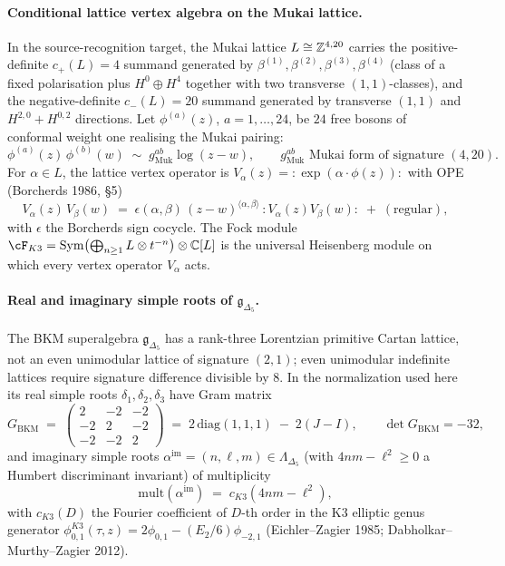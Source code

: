\paragraph{Conditional lattice vertex algebra on the Mukai lattice.}
In the source-recognition target, the Mukai lattice
$L \cong \mathbb{Z}^{4,20}$ carries the positive-definite
$c_+(L) = 4$ summand generated by
$\beta^{(1)},\beta^{(2)},\beta^{(3)},\beta^{(4)}$ (class of a fixed
polarisation plus $H^0 \oplus H^4$ together with two transverse
$(1,1)$-classes), and the negative-definite $c_-(L) = 20$ summand
generated by transverse $(1,1)$ and $H^{2,0}+H^{0,2}$ directions. Let
$\phi^{(a)}(z)$, $a = 1,\ldots,24$, be $24$ free bosons of conformal
weight one realising the Mukai pairing:
\begin{equation}
\label{eq:voa-muk-ope}
  \phi^{(a)}(z)\,\phi^{(b)}(w) \;\sim\; g^{ab}_{\mathrm{Muk}}\log(z-w),
  \qquad g^{ab}_{\mathrm{Muk}} \text{ Mukai form of signature }(4,20).
\end{equation}
For $\alpha \in L$, the lattice vertex operator is
$V_\alpha(z) = {:}\exp(\alpha\cdot\phi(z)){:}$ with OPE (Borcherds 1986, \S5)
\begin{equation}
\label{eq:voa-lattice-vo-ope}
  V_\alpha(z)\,V_\beta(w)
    \;=\;
    \epsilon(\alpha,\beta)\,(z-w)^{\langle\alpha,\beta\rangle}
    \,{:}V_\alpha(z)V_\beta(w){:} \;+\; (\text{regular}),
\end{equation}
with $\epsilon$ the Borcherds sign cocycle. The Fock module
$\cF_{K3} = \mathrm{Sym}\bigl(\bigoplus_{n\geq 1}L\otimes t^{-n}\bigr)
\otimes \Cbb[L]$ is the universal Heisenberg module on which every
vertex operator $V_\alpha$ acts.

\paragraph{Real and imaginary simple roots of $\mathfrak g_{\Delta_5}$.}
The BKM superalgebra $\mathfrak g_{\Delta_5}$ has a rank-three
Lorentzian primitive Cartan lattice, not an even unimodular lattice of
signature $(2,1)$; even unimodular indefinite lattices require
signature difference divisible by $8$. In the normalization used here
its real simple roots $\delta_1,\delta_2,\delta_3$ have Gram matrix
\begin{equation}
\label{eq:voa-BKM-Gram}
  G_{\mathrm{BKM}} \;=\; \begin{pmatrix} 2 & -2 & -2 \\ -2 & 2 & -2 \\ -2 & -2 & 2 \end{pmatrix}
  \;=\; 2\,\mathrm{diag}(1,1,1) \;-\; 2(J - I), \qquad \det G_{\mathrm{BKM}} = -32,
\end{equation}
and imaginary simple roots $\alpha^{\mathrm{im}} = (n,\ell,m) \in \Lambda_{\Delta_5}$
(with $4nm - \ell^2 \geq 0$ a Humbert discriminant invariant) of
multiplicity
\begin{equation}
\label{eq:voa-imag-mult}
  \mathrm{mult}(\alpha^{\mathrm{im}}) \;=\; c_{K3}(4nm - \ell^2),
\end{equation}
with $c_{K3}(D)$ the Fourier coefficient of $D$-th order in the K3
elliptic genus generator
$\phi^{K3}_{0,1}(\tau,z) = 2\phi_{0,1} - (E_2/6)\phi_{-2,1}$
(Eichler--Zagier 1985; Dabholkar--Murthy--Zagier 2012).

